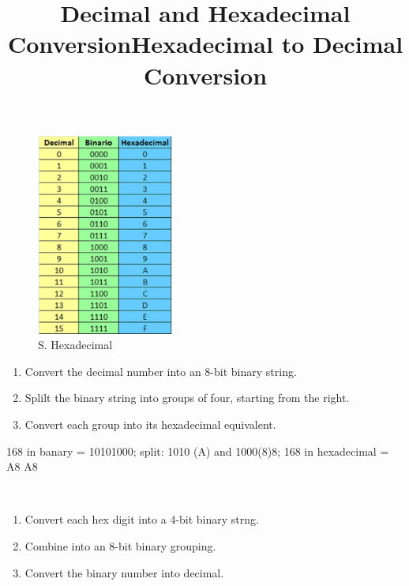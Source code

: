 \documentclass[a4paper,11pt]{article}
\begin{document}
\begin{figure}[h!]
    \centering
    \includegraphics[width=0.4\textwidth]{14.png}
    \caption{S. Hexadecimal}
    \label{fig:cap1}
\end{figure}

\title{Decimal and Hexadecimal Conversion}
\begin{enumerate}
    \item Convert the decimal number into an 8-bit binary string.\\
    \item Splilt the binary string into groups of four, starting from the right.\\
    \item Convert each group into its hexadecimal equivalent.\\
\end{enumerate}

\begin{tcolorbox}[colframe=gray!80, colback=gray!20, coltitle=black, title= Example: ]
168 in banary = 10101000; split: 1010 (A) and 1000(8)8; 168 in hexadecimal = A8
A8
\end{tcolorbox}

\newpage
\title{Hexadecimal to Decimal Conversion}\\
\begin{enumerate}
    \item Convert each hex digit into a 4-bit binary strng.\\
    \item Combine into an 8-bit binary grouping.\\
    \item Convert the binary number into decimal.\\
\end{enumerate}
\end{document}
